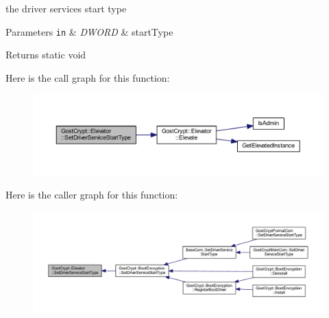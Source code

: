 the driver services start type 


\begin{DoxyParams}[1]{Parameters}
\mbox{\tt in}  & {\em D\+W\+O\+RD} & start\+Type \\
\hline
\end{DoxyParams}
\begin{DoxyReturn}{Returns}
static void 
\end{DoxyReturn}
Here is the call graph for this function\+:
\nopagebreak
\begin{figure}[H]
\begin{center}
\leavevmode
\includegraphics[width=350pt]{class_gost_crypt_1_1_elevator_a7756cd9baaf29a8375bf42210961504d_cgraph}
\end{center}
\end{figure}
Here is the caller graph for this function\+:
\nopagebreak
\begin{figure}[H]
\begin{center}
\leavevmode
\includegraphics[width=350pt]{class_gost_crypt_1_1_elevator_a7756cd9baaf29a8375bf42210961504d_icgraph}
\end{center}
\end{figure}
\mbox{\label{class_gost_crypt_1_1_elevator_a4715568a6dfa5d681642b3ef420be6de}} 
